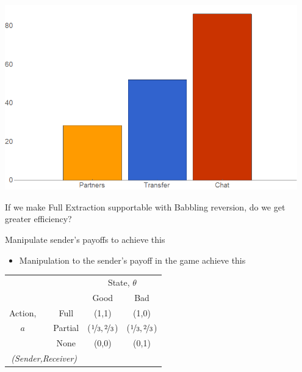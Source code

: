 \documentclass{beamer}
\begin{document}
\begin{frame}
\begin{card}
    \begin{center}
    \includegraphics[width=0.95\textwidth]{./i/EffTip.png}
    \end{center}
\end{card}
\end{frame}

\begin{frame}
\begin{card}[Question]
    If we make Full Extraction supportable with Babbling reversion, do we get greater efficiency?
\end{card}
\begin{card}[Diagnostics 3 \& 4]
Manipulate sender's payoffs to achieve this
    \begin{itemize}
        \item Manipulation to the sender's payoff in the game achieve this 
    \end{itemize}
\end{card}
\end{frame}
\begin{frame}
\begin{card}[Baseline]
	\begin{center}%
		\begin{tabular}{c|cc|c|c|}
		\multicolumn{1}{c}{} &  & \multicolumn{1}{c}{} & \multicolumn{2}{c}{State, $\theta$} \\ 
		\cline{4-5} 
		\multicolumn{1}{c}{} &  & \multicolumn{1}{c}{} & \multicolumn{1}{c}{Good} & \multicolumn{1}{c}{Bad} \\ 
		\cline{4-5} 
		Action, &  & Full & (1,1) & (1,0) \\ 
		\cline{4-5} 
		$a$ &  & Partial & ($\nicefrac{1}{3},\nicefrac{2}{3}$) & ($\nicefrac{1}{3},\nicefrac{2}{3}$) \\ 
		\cline{4-5} 
		 &  & None & (0,0) & (0,1) \\ 
		\cline{4-5} 
		\multicolumn{3}{c}{\emph{(Sender,Receiver)}} & \multicolumn{1}{c}{} & \multicolumn{1}{c}{} \\ 
		\end{tabular}
	\end{center}
\end{card}
\end{frame}
\end{document}
